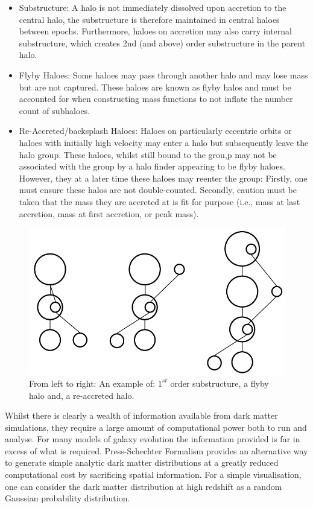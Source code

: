 \begin{itemize}
    \item Substructure: A halo is not immediately dissolved upon accretion to the central halo, the substructure is therefore maintained in central haloes between epochs. Furthermore, haloes on accretion may also carry internal substructure, which creates 2nd (and above) order substructure in the parent halo.
    \item Flyby Haloes: Some haloes may pass through another halo and may lose mass but are not captured. These haloes are known as flyby halos and must be accounted for when constructing mass functions to not inflate the number count of subhaloes.
    \item Re-Accreted/backsplash Haloes: Haloes on particularly eccentric orbits or haloes with initially high velocity may enter a halo but subsequently leave the halo group. These haloes, whilst still bound to the grou,p may not be associated with the group by a halo finder appearing to be flyby haloes. However, they at a later time these haloes may reenter the group: Firstly, one must ensure these halos are not double-counted. Secondly, caution must be taken that the mass they are accreted at is fit for purpose (i.e., mass at last accretion, mass at first accretion, or peak mass).
\end{itemize}

\begin{figure}[h]
    \centering
    \includegraphics[width = \linewidth]{Figures/Chapter1/Substructures.png}
    \caption{From left to right: An example of: $1^{st}$ order substructure, a flyby halo and, a re-accreted halo.}
    \label{fig:Substructures}
\end{figure}

Whilst there is clearly a wealth of information available from dark matter simulations, they require a large amount of computational power both to run and analyse. For many models of galaxy evolution the information provided is far in excess of what is required. Press-Schechter Formalism \citep{Press1974} provides an alternative way to generate simple analytic dark matter distributions at a greatly reduced computational cost by sacrificing spatial information. For a simple visualisation, one can consider the dark matter distribution at high redshift as a random Gaussian probability distribution. 


